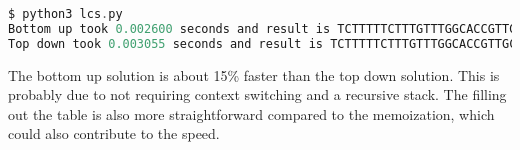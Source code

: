 \documentclass[12pt]{article}
\newenvironment{problem}[2][Problem]{\begin{trivlist}
\item[\hskip \labelsep {\bfseries #1}\hskip \labelsep {\bfseries #2.}]}{\end{trivlist}}
\begin{document}
\begin{problem}{1}
\begin{lstlisting}[language=C, caption=Terminal output running code]
$ python3 lcs.py 
Bottom up took 0.002600 seconds and result is TCTTTTTCTTTGTTTGGCACCGTTGCGGCTACCTTGCAGCTCTGCATCTTGGCTCTACTGCACT
Top down took 0.003055 seconds and result is TCTTTTTCTTTGTTTGGCACCGTTGCGGCTACCTTGCAGCTCTGCATCTTGGCTCTACTGCACT
\end{lstlisting}
The bottom up solution is about 15\% faster than the top down solution. This is probably due to not requiring context switching and a recursive stack.
The filling out the table is also more straightforward compared to the memoization, which could also contribute to the speed.

\end{problem}

 
\end{document}
